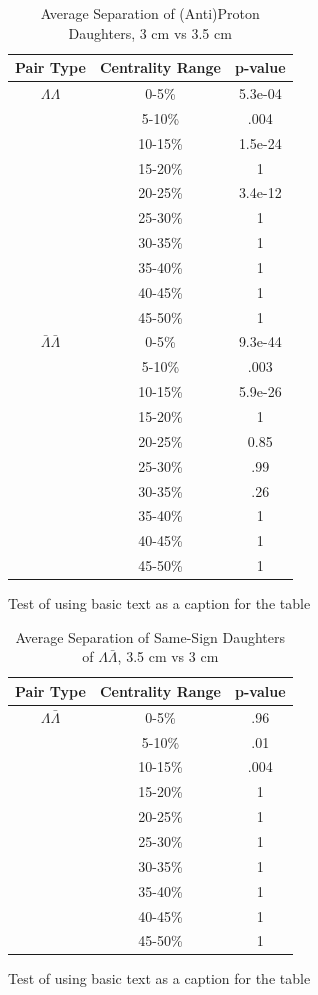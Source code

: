 \begin{table}
\caption{Average Separation of (Anti)Proton Daughters, 3 cm vs 3.5 cm} \label{tab:AvgSepProtDaughters3cmVs35cm}
\begin{center}
\begin{tabular}{| c | c | c |}
  \hline                       
  Pair Type & Centrality Range & p-value \\
  \hline
  $\Lambda\Lambda$ & 0-5\% & 5.3e-04 \\
   & 5-10\%  & .004 \\
   & 10-15\% & 1.5e-24 \\
   & 15-20\% & 1 \\
   & 20-25\% & 3.4e-12 \\
   & 25-30\% & 1 \\
   & 30-35\% & 1 \\
   & 35-40\% & 1 \\
   & 40-45\% & 1 \\
   & 45-50\% & 1 \\
   \hline
  $\bar{\Lambda}\bar{\Lambda}$ &  0-5\% & 9.3e-44 \\
   & 5-10\% & .003 \\
   & 10-15\% & 5.9e-26 \\
   & 15-20\% & 1 \\
   & 20-25\% & 0.85 \\
   & 25-30\% & .99 \\
   & 30-35\% & .26 \\
   & 35-40\% & 1 \\
   & 40-45\% & 1 \\
   & 45-50\% & 1 \\
   \hline
\end{tabular}
Test of using basic text as a caption for the table
\end{center}
\end{table}

\begin{table}
\caption{Average Separation of Same-Sign Daughters of $\Lambda\bar{\Lambda}$, 3.5 cm vs 3 cm} \label{tab:AvgSepProtDaughters35cmVs3cm}
\begin{center}
\begin{tabular}{| c | c | c |}
  \hline                       
  Pair Type & Centrality Range & p-value \\
   \hline
  $\Lambda\bar{\Lambda}$ &  0-5\% & .96 \\
   & 5-10\% & .01 \\
   & 10-15\% & .004 \\
   & 15-20\% & 1 \\
   & 20-25\% & 1 \\
   & 25-30\% & 1 \\
   & 30-35\% & 1 \\
   & 35-40\% & 1 \\
   & 40-45\% & 1 \\
   & 45-50\% & 1 \\
  \hline  
\end{tabular}
Test of using basic text as a caption for the table
\end{center}
\end{table}

